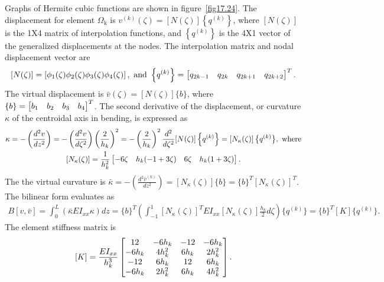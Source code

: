 \documentclass{AeroStructure-ERJohnson}
\begin{document}
\noindent Graphs of Hermite cubic functions are shown in figure~\ref{fig17.24}. The displacement for element $\Omega_{\textrm{k}}$ is $v^{(k)}(\zeta)=[N(\zeta)]\left\{q^{(k)}\right\}$, where $[N(\zeta)]$ is the 1X4 matrix of interpolation functions, and $\left\{q^{(k)}\right\}$ is the 4X1 vector of the generalized displacements at the nodes. The interpolation matrix and nodal displacement vector are
\begin{align}\label{eq17.142}
[N(\zeta)]=\left[\phi_{1}(\zeta) \phi_{2}(\zeta) \phi_{3}(\zeta) \phi_{4}(\zeta)\right], \textrm{ and } \left\{q^{(k)}\right\}=\left[\begin{array}{@{}llll@{}} q_{2 k-1} & q_{2 k} & q_{2 k+1} & q_{2 k+2}\end{array}\right]^{T}.
\end{align}
The virtual displacement is $\bar{v}(\zeta)=[N(\zeta)]\{b\}$, where $\{b\}=\left[\begin{array}{@{}llll@{}}b_{1} & b_{2} & b_{3} & b_{4}\end{array}\right]^{T}$. The second derivative of the displacement, or curvature $\kappa$ of the centroidal axis in bending, is expressed as
\begin{gather}
\kappa=-\left(\frac{d^{2} v}{d z^{2}}\right)=-\left(\frac{d^{2} v}{d \zeta^{2}}\right)\left(\frac{2}{h_{k}}\right)^{2}=-\left(\frac{2}{h_{k}}\right)^{2} \frac{d^{2}}{d \zeta^{2}}[N(\zeta)]\left\{q^{(k)}\right\}=\left[N_{\kappa}(\zeta)\right]\big\{q^{(k)}\big\}, \textrm{ where}\label{eq17.143}\\
\left[N_{\kappa}(\zeta)\right]=\frac{1}{h_{k}^{2}}\left[\begin{array}{@{}llll@{}} -6 \zeta & h_{k}(-1+3 \zeta) & 6 \zeta & h_{k}(1+3 \zeta)\end{array}\right].
\end{gather}
The the virtual curvature is $\bar{\kappa}=-\left(\frac{d^{2} \bar{v}^{(k)}}{d z^{2}}\right)=\left[N_{\kappa}(\zeta)\right]\{b\}=\{b\}^{T}\left[N_{\kappa}(\zeta)\right]^{T}$. The bilinear form evaluates as
\begin{align}\label{eq17.145}
B[v, \bar{v}]=\int_{0}^{L}\left(\bar{\kappa} E I_{x x} \kappa\right) d z=\{b\}^{T}\left(\int_{-1}^{1}\left[N_{\kappa}(\zeta)\right]^{T} E I_{x x}\left[N_{\kappa}(\zeta)\right] \frac{h_{k}}{2} d \zeta\right)\big\{q^{(k)}\big\}=\{b\}^{T}[K]\big\{q^{(k)}\big\}.
\end{align}
The element stiffness matrix is
\begin{align}\label{eq17.146}
[K]=\frac{E I_{x x}}{h_{k}^{3}}\left[\begin{array}{@{}cccc@{}}12 & -6 h_{k} & -12 & -6 h_{k} \\-6 h_{k} & 4 h_{k}^{2} & 6 h_{k} & 2 h_{k}^{2} \\-12 & 6 h_{k} & 12 & 6 h_{k} \\-6 h_{k} & 2 h_{k}^{2} & 6 h_{k} & 4 h_{k}^{2}\end{array}\right].
\end{align}
\end{document}
